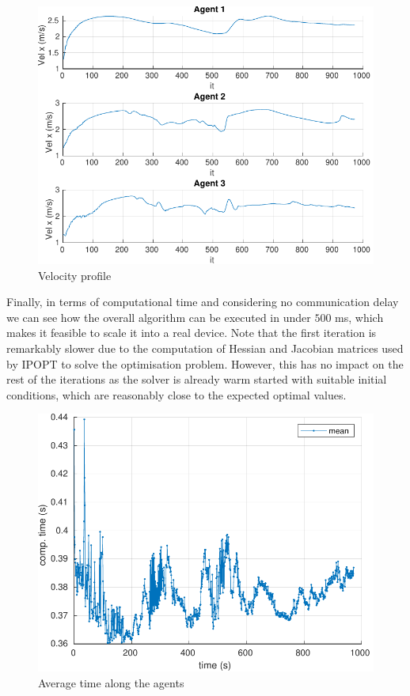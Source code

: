 \documentclass[letterpaper, 10 pt, conference]{ieeeconf}  %
\begin{document}
\begin{figure}
  \centering
  \includegraphics[width=\columnwidth]{figs/Cstates.pdf}
    \caption{Velocity profile }
    \label{fig:Vcomp}
\end{figure}

Finally, in terms of computational time and considering no communication delay we can see how the overall algorithm can be executed in under $500$ ms, which makes it feasible to scale it into a real device. Note that the first iteration is remarkably slower due to the computation of Hessian and Jacobian matrices used by IPOPT to solve the optimisation problem. However, this has no impact on the rest of the iterations as the solver is already warm started with suitable initial conditions, which are reasonably close to the expected optimal values.   \\ 

\begin{figure}
  \centering
  \includegraphics[width=\columnwidth]{figs/time.pdf}
    \caption{Average time along the agents}
    \label{fig:Tcomp}
\end{figure}
\end{document}
